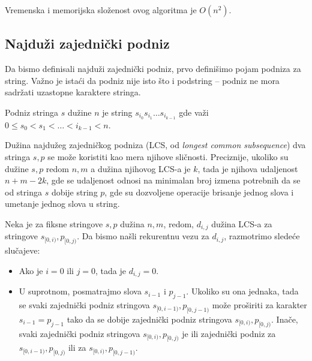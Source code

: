 \noindent
\begin{minipage}[l]{\textwidth}

\end{minipage}

Vremenska i memorijska slo\v zenost ovog algoritma je $O(n^2)$.

\subsection{Najdu\v zi zajedni\v cki podniz}

Da bismo definisali najdu\v zi zajedni\v cki podniz, prvo defini\v simo pojam podniza za string. Va\v zno je ista\' ci da podniz nije isto \v sto i podstring -- podniz ne mora sadr\v zati uzastopne karaktere stringa.

\begin{dfn}
Podniz stringa $s$ du\v zine $n$ je string $s_{i_0}s_{i_1}\ldots s_{i_{k-1}}$ gde va\v zi $0 \leq s_0 < s_1 < \ldots < i_{k-1} < n$.
\end{dfn}

Du\v zina najdu\v zeg zajedni\v ckog podniza (LCS, od \textit{longest common subsequence}) dva stringa $s,p$ se mo\v ze koristiti kao mera njihove sli\v cnosti. Preciznije, ukoliko su du\v zine $s,p$ redom $n,m$ a du\v zina njihovog LCS-a je $k$, tada je njihova udaljenost $n+m-2k$, gde se udaljenost odnosi na minimalan broj izmena potrebnih da se od stringa $s$ dobije string $p$, gde su dozvoljene operacije brisanje jednog slova i umetanje jednog slova u string.

Neka je za fiksne stringove $s,p$ du\v zina $n,m$, redom, $d_{i,j}$ du\v zina LCS-a za stringove $s_{[0, i)}, p_{[0, j)}$. Da bismo na\v sli rekurentnu vezu za $d_{i,j}$, razmotrimo slede\' ce slu\v cajeve:

\begin{itemize}
\item Ako je $i=0$ ili $j=0$, tada je $d_{i,j} = 0$.
\item U suprotnom, posmatrajmo slova $s_{i-1}$ i $p_{j-1}$. Ukoliko su ona jednaka, tada se svaki zajedni\v cki podniz stringova $s_{[0, i-1)}, p_{[0, j-1)}$ mo\v ze pro\v siriti za karakter $s_{i-1} = p_{j-1}$ tako da se dobije zajedni\v cki podniz stringova $s_{[0, i)}, p_{[0, j)}$. Ina\v ce, svaki zajedni\v cki podniz stringova $s_{[0, i)}, p_{[0, j)}$ je ili zajedni\v cki podniz za $s_{[0, i-1)}, p_{[0, j)}$ ili za $s_{[0, i)}, p_{[0, j-1)}$.
\end{itemize}

